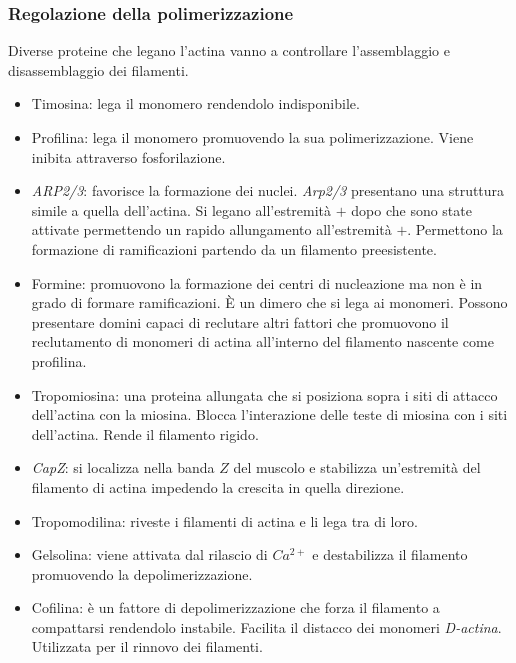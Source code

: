 		\subsubsection{Regolazione della polimerizzazione}
		Diverse proteine che legano l'actina vanno a controllare l'assemblaggio e disassemblaggio dei filamenti.
		\begin{multicols}{2}
			\begin{itemize}
				\item Timosina: lega il monomero rendendolo indisponibile.
				\item Profilina: lega il monomero promuovendo la sua polimerizzazione.
					Viene inibita attraverso fosforilazione.
				\item \emph{ARP2/3}: favorisce la formazione dei nuclei.
					\emph{Arp2/3} presentano una struttura simile a quella dell'actina.
					Si legano all'estremit\`a $+$ dopo che sono state attivate permettendo un rapido allungamento all'estremit\`a $+$.
					Permettono la formazione di ramificazioni partendo da un filamento preesistente.
				\item Formine: promuovono la formazione dei centri di nucleazione ma non \`e in grado di formare ramificazioni.
					\`E un dimero che si lega ai monomeri.
					Possono presentare domini capaci di reclutare altri fattori che promuovono il reclutamento di monomeri di actina all'interno del filamento nascente come profilina.
				\item Tropomiosina: una proteina allungata che si posiziona sopra i siti di attacco dell'actina con la miosina.
					Blocca l'interazione delle teste di miosina con i siti dell'actina.
					Rende il filamento rigido.
				\item \emph{CapZ}: si localizza nella banda $Z$ del muscolo e stabilizza un'estremit\`a del filamento di actina impedendo la crescita in quella direzione.
				\item Tropomodilina: riveste i filamenti di actina e li lega tra di loro.
				\item Gelsolina: viene attivata dal rilascio di \emph{$Ca^{2+}$} e destabilizza il filamento promuovendo la depolimerizzazione.
				\item Cofilina: \`e un fattore di depolimerizzazione che forza il filamento a compattarsi rendendolo instabile.
					Facilita il distacco dei monomeri \emph{D-actina}.
					Utilizzata per il rinnovo dei filamenti.
			\end{itemize}
		\end{multicols}

